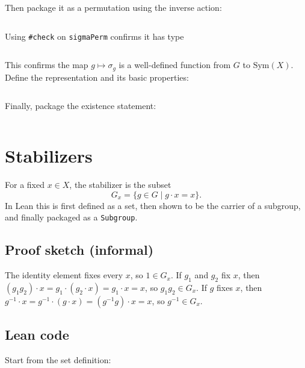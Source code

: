 \documentclass[
  12pt, %
]{assignment}
\newcommand{\leancodeurl}{}
\newcommand{\setleancodeurl}[1]{\renewcommand{\leancodeurl}{#1}}
\newcommand{\leancodefile}[3][]{%
  \setleancodeurl{#3}%
  \inputminted[fontsize=\footnotesize,breaklines,breakanywhere,tabsize=4,showspaces=false,linenos=true,#1]{lean4}{#2}%
}
\begin{document}
Then package it as a permutation using the inverse action:
\leancodefile[firstline=34,lastline=64,firstnumber=34]{../lean/GroupAction/Permutation.lean}{https://github.com/FrankieeW/GroupAction/blob/v1.2.0/lean/GroupAction/Permutation.lean}
Using \texttt{\#check} on \texttt{sigmaPerm} confirms it has type
\leancodefile[firstline=65,lastline=65,firstnumber=65]{../lean/GroupAction/Permutation.lean}{https://github.com/FrankieeW/GroupAction/blob/v1.2.0/lean/GroupAction/Permutation.lean}
This confirms the map $g \mapsto \sigma_g$ is a well-defined function from $G$ to $\mathrm{Sym}(X)$.
Define the representation and its basic properties:
\leancodefile[firstline=69,lastline=100,firstnumber=69]{../lean/GroupAction/Permutation.lean}{https://github.com/FrankieeW/GroupAction/blob/v1.2.0/lean/GroupAction/Permutation.lean}

Finally, package the existence statement:
\leancodefile[firstline=103,lastline=108,firstnumber=103]{../lean/GroupAction/Permutation.lean}{https://github.com/FrankieeW/GroupAction/blob/v1.2.0/lean/GroupAction/Permutation.lean}

\section{Stabilizers}
For a fixed $x \in X$, the stabilizer is the subset
\[
	G_x = \{ g \in G \mid g \cdot x = x \}.
\]
In Lean this is first defined as a set, then shown to be the carrier of a subgroup,
and finally packaged as a \texttt{Subgroup}.

\subsection{Proof sketch (informal)}
The identity element fixes every $x$, so $1 \in G_x$. If $g_1$ and $g_2$ fix $x$, then
$(g_1 g_2)\cdot x = g_1 \cdot (g_2 \cdot x) = g_1 \cdot x = x$, so $g_1 g_2 \in G_x$.
If $g$ fixes $x$, then
$g^{-1} \cdot x = g^{-1} \cdot (g \cdot x) = (g^{-1} g) \cdot x = x$,
so $g^{-1} \in G_x$.

\subsection{Lean code}
Start from the set definition:
\leancodefile[firstline=24,lastline=25,firstnumber=24]{../lean/GroupAction/Stabilizer.lean}{https://github.com/FrankieeW/GroupAction/blob/v1.2.0/lean/GroupAction/Stabilizer.lean}
\end{document}
